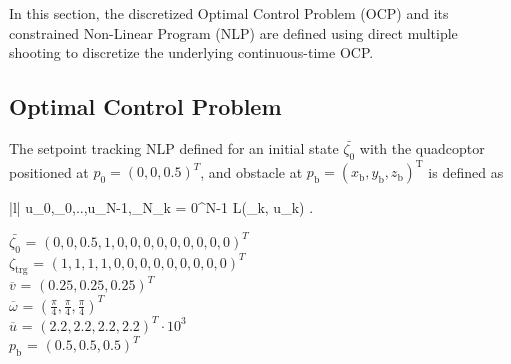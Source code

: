 \documentclass[conference]{IEEEtran}
\begin{document}
In this section, the discretized Optimal Control Problem (OCP) and its constrained Non-Linear Program (NLP) are defined using direct multiple shooting \cite{bock_multiple_1984} to discretize the underlying continuous-time OCP.

\subsection{Optimal Control Problem}

\par The setpoint tracking NLP defined for an initial state $\bar{\zeta_0}$ with the quadcoptor positioned at $p_0 = (0, 0, 0.5)^T$, and obstacle at $p_\mathrm{b} = (x_\mathrm{b}, y_\mathrm{b}, z_\mathrm{b})^{\mathrm{T}}$ is defined as

\begin{mini!}|l|
	{u_0,\zeta_0,..,u_{N-1},\zeta_N}{\sum_{k = 0}^{N-1} L\left(\zeta_{k}, u_k\right)}{{\label{OCP}}}{}
	.
\end{mini!}

\begin{flushleft}
$\bar{\zeta_0}$ \hspace{0.18in}= $(0, 0, 0.5, 1, 0, 0, 0, 0, 0, 0, 0, 0, 0)^T$\\
$\zeta_{\mathrm{trg}}$ \hspace{0.08in}= $( 1, 1, 1, 1, 0, 0, 0, 0, 0, 0, 0, 0, 0)^T$\\
$\overline{v}$ \hspace{0.22in}= $(0.25,0.25,0.25)^T$\\
$\overline{\omega}$ \hspace{0.22in}= $(\frac{\pi}{4},\frac{\pi}{4},\frac{\pi}{4})^T$\\
$\overline{u}$ \hspace{0.22in}= $(2.2, 2.2, 2.2, 2.2)^T \cdot 10^{3}$\\
$p_\mathrm{b}$ \hspace{0.18in}= $(0.5, 0.5, 0.5)^T$\\
\end{flushleft}
\end{document}
